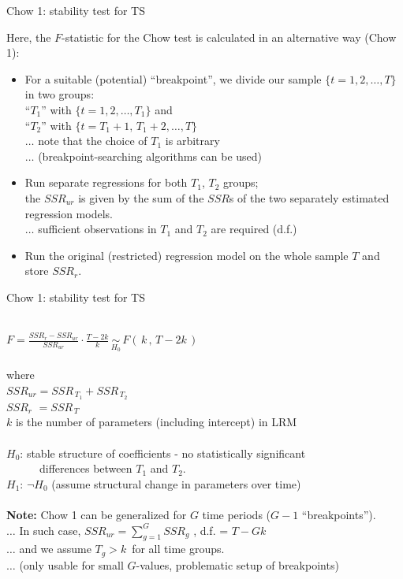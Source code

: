 \documentclass{beamer}
\begin{document}
\begin{frame}{Chow 1: stability test for TS}

Here, the $F$-statistic for the Chow test is calculated in an alternative way (Chow 1):

\begin{itemize}
\item For a suitable (potential) ``breakpoint'', we divide our sample $\{t=1,2, \dots, T\}$ in two groups: \\
``$T_1$'' with $\{t=1,2, \dots, T_1\}$ and \\
``$T_2$'' with $\{t=T_1 \!+\!1, \, T_1 \!+\!2, \dots, T\}$ \\
$\dots$ note that the choice of $T_1$ is arbitrary \\
$\dots$ (breakpoint-searching algorithms can be used)
\item Run separate regressions for both $T_1$, $T_2$ groups;  \\
the $\textit{SSR}_{\textit{ur}}$ is given by the sum of the $\textit{SSR}$s of the two separately estimated regression models. \\
$\dots$ sufficient observations in $T_1$ and $T_2$ are required (d.f.) 
\item Run the original (restricted) regression model on the whole sample $T$ and store $\textit{SSR}_r$.
\end{itemize}

\end{frame}
\begin{frame}{Chow 1: stability test for TS}

~\\
$F = \frac{\textit{SSR}_{r}-\textit{SSR}_{ur}}{\textit{SSR}_{ur}}
   \cdot \frac{T-2k}{k} \,
   \underset{H_0}{\sim} \,
   F(\,k \,,\, T\!-\!2k \, ) $ \\
~ \\
where\\
$\textit{SSR}_{ur} = \textit{SSR}_{\,T_1} + \textit{SSR}_{\,T_2} $\\
$\textit{SSR}_{r} \,\,= \textit{SSR}_{\,T}$\\
$k$ is the number of parameters (including intercept) in LRM\\
~ \\
$H_0$: stable structure of coefficients - no statistically significant\\ 
~~~~~~differences between $T_1$ and $T_2$.\\
$H_1$: $\neg H_0$ (assume structural change in parameters over time)\\
~ \\
\footnotesize{
\textbf{Note:} Chow 1 can be generalized for $G$ time periods ($G-1$ ``breakpoints'').\\
$\dots$ In such case, $\textit{SSR}_{ur}= \sum_{g=1}^G \! \textit{SSR}_{g} $ , d.f. = $T-Gk$ \\
$\dots$ and we assume $T_g > k \,$ for all time groups.\\
$\dots$ (only usable for small $G$-values, problematic setup of breakpoints)
}
\end{frame}
\end{document}
